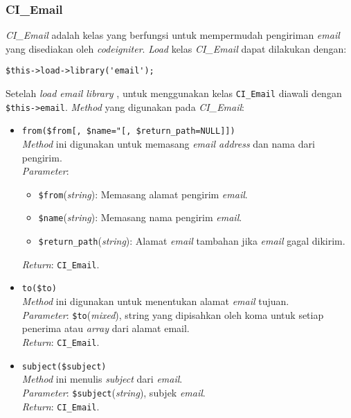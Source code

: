  
\subsubsection{CI\_Email}
\textit{CI\_Email} adalah kelas yang berfungsi untuk mempermudah pengiriman \textit{email} yang disediakan oleh \textit{codeigniter}. \textit{Load} kelas \textit{CI\_Email} dapat dilakukan dengan:
\begin{lstlisting}
$this->load->library('email');
\end{lstlisting}
Setelah \textit{load email library} , untuk menggunakan kelas \texttt{CI\_Email} diawali dengan \texttt{\$this->email}. \textit{Method} yang digunakan pada \textit{CI\_Email}:

\begin{itemize}
	\item \texttt{from(\$from[, \$name="[, \$return\_path=NULL]])} \\
	\textit{Method} ini digunakan untuk memasang \textit{email address} dan nama dari pengirim. \\ 
	\textit{Parameter}:
	\begin{itemize}
		\item \texttt{\$from}(\textit{string}): Memasang alamat pengirim \textit{email}.
		\item \texttt{\$name}(\textit{string}): Memasang nama pengirim \textit{email}.
		\item \texttt{\$return\_path}(\textit{string}): Alamat \textit{email} tambahan jika \textit{email} gagal dikirim.
	\end{itemize}
	\textit{Return}: \texttt{CI\_Email}.
	
	\item \texttt{to(\$to)} \\
	\textit{Method} ini digunakan untuk menentukan alamat \textit{email} tujuan. \\
	\textit{Parameter}: \texttt{\$to}(\textit{mixed}), string yang dipisahkan oleh koma untuk setiap penerima atau \textit{array} dari alamat email. \\
	\textit{Return}: \texttt{CI\_Email}.
	
	\item \texttt{subject(\$subject)} \\ 
	\textit{Method} ini menulis \textit{subject} dari \textit{email}. \\
	\textit{Parameter}: \texttt{\$subject}(\textit{string}), subjek \textit{email}. \\
	\textit{Return}: \texttt{CI\_Email}.
	

\end{itemize}
